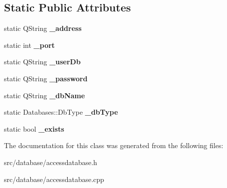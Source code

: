 \subsection*{Static Public Attributes}
\begin{DoxyCompactItemize}
\item 
\hypertarget{classDatabases_1_1AccessDatabase_a55d2effa9db8712ed59e1c812d0976a5}{}static Q\+String {\bfseries \+\_\+address}\label{classDatabases_1_1AccessDatabase_a55d2effa9db8712ed59e1c812d0976a5}

\item 
\hypertarget{classDatabases_1_1AccessDatabase_a3a0d5ea34848774e22513478bc8f2438}{}static int {\bfseries \+\_\+port}\label{classDatabases_1_1AccessDatabase_a3a0d5ea34848774e22513478bc8f2438}

\item 
\hypertarget{classDatabases_1_1AccessDatabase_ab8bce721fe627ad70763584d590c74f0}{}static Q\+String {\bfseries \+\_\+user\+Db}\label{classDatabases_1_1AccessDatabase_ab8bce721fe627ad70763584d590c74f0}

\item 
\hypertarget{classDatabases_1_1AccessDatabase_a8784a122fe511b200fd8e2fa1c327ac6}{}static Q\+String {\bfseries \+\_\+password}\label{classDatabases_1_1AccessDatabase_a8784a122fe511b200fd8e2fa1c327ac6}

\item 
\hypertarget{classDatabases_1_1AccessDatabase_a754d01d8f769d85e360f6a06380ff4a9}{}static Q\+String {\bfseries \+\_\+db\+Name}\label{classDatabases_1_1AccessDatabase_a754d01d8f769d85e360f6a06380ff4a9}

\item 
\hypertarget{classDatabases_1_1AccessDatabase_a45087af6b64738f00a5338e32887ce91}{}static Databases\+::\+Db\+Type {\bfseries \+\_\+db\+Type}\label{classDatabases_1_1AccessDatabase_a45087af6b64738f00a5338e32887ce91}

\item 
\hypertarget{classDatabases_1_1AccessDatabase_a4041377d9c32522f62a70d750d34e581}{}static bool {\bfseries \+\_\+exists}\label{classDatabases_1_1AccessDatabase_a4041377d9c32522f62a70d750d34e581}

\end{DoxyCompactItemize}


The documentation for this class was generated from the following files\+:\begin{DoxyCompactItemize}
\item 
src/database/accessdatabase.\+h\item 
src/database/accessdatabase.\+cpp\end{DoxyCompactItemize}

